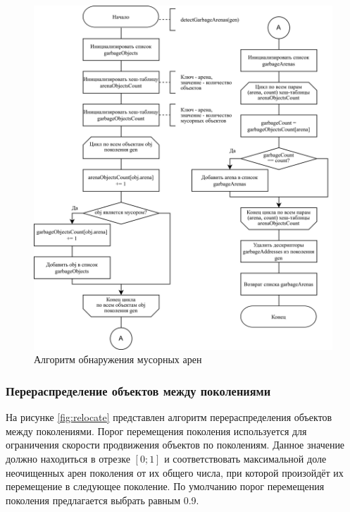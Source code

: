 \begin{figure}[H]
	\centering
	\includegraphics[width=\textwidth]{assets/sweep-2.png}
	\caption{Алгоритм обнаружения мусорных арен}
	\label{fig:sweep-2}
\end{figure}

%

\subsubsection{Перераспределение объектов между поколениями}

На рисунке \ref{fig:relocate} представлен алгоритм перераспределения объектов между поколениями. Порог перемещения поколения используется для ограничения скорости продвижения объектов по поколениям. Данное значение должно находиться в отрезке $[0; 1]$ и соответствовать максимальной доле неочищенных арен поколения от их общего числа, при которой произойдёт их перемещение в следующее поколение. По умолчанию порог перемещения поколения предлагается выбрать равным 0.9.

